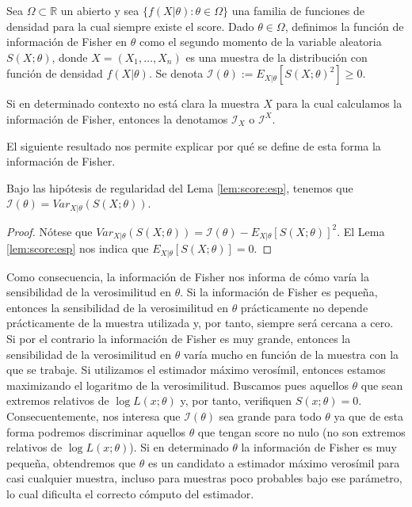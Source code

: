 \documentclass{article}
\begin{document}
    \begin{definition}
        Sea $\Omega \subset \mathbb{R}$ un abierto y sea $\{f(X|\theta): \theta \in \Omega\}$ una familia de funciones de densidad para la cual siempre existe el score. Dado $\theta \in \Omega$, definimos la función de información de Fisher en $\theta$ como el segundo momento de la variable aleatoria $S(X;\theta)$, donde $X = (X_1, \ldots, X_n)$ es una muestra de la distribución con función de densidad $f(X|\theta)$. Se denota $\mathcal{I}(\theta) := E_{X|\theta}[S(X;\theta)^2] \ge 0.$
    \end{definition}

    Si en determinado contexto no está clara la muestra $X$ para la cual calculamos la información de Fisher, entonces la denotamos $\mathcal{I}_X$ o $\mathcal{I}^X$.

    El siguiente resultado nos permite explicar por qué se define de esta forma la información de Fisher.

    \begin{cor}
        Bajo las hipótesis de regularidad del Lema \ref{lem:score:esp}, tenemos que  $\mathcal{I}(\theta) = Var_{X|\theta}(S(X;\theta))$.
    \end{cor}
    \begin{proof}
        Nótese que $Var_{X|\theta}(S(X;\theta)) = \mathcal{I}(\theta) - E_{X|\theta}[S(X; \theta)]^2$. El Lema \ref{lem:score:esp} nos indica que $E_{X|\theta}[S(X; \theta)] = 0$.
    \end{proof}

    Como consecuencia, la información de Fisher nos informa de cómo varía la sensibilidad de la verosimilitud en $\theta$. Si la información de Fisher es pequeña, entonces la sensibilidad de la verosimilitud en $\theta$ prácticamente no depende prácticamente de la muestra utilizada y, por tanto, siempre será cercana a cero. Si por el contrario la información de Fisher es muy grande, entonces la sensibilidad de la verosimilitud en $\theta$ varía mucho en función de la muestra con la que se trabaje. Si utilizamos el estimador máximo verosímil, entonces estamos maximizando el logaritmo de la verosimilitud. Buscamos pues aquellos $\theta$ que sean extremos relativos de $\log L(x; \theta)$ y, por tanto, verifiquen $S(x; \theta) = 0$. Consecuentemente, nos interesa que $\mathcal{I}(\theta)$ sea grande para todo $\theta$ ya que de esta forma podremos discriminar aquellos $\theta$ que tengan score no nulo (no son extremos relativos de $\log L(x; \theta)$). Si en determinado $\theta$ la información de Fisher es muy pequeña, obtendremos que $\theta$ es un candidato a estimador máximo verosímil para casi cualquier muestra, incluso para muestras poco probables bajo ese parámetro, lo cual dificulta el correcto cómputo del estimador.
\end{document}
